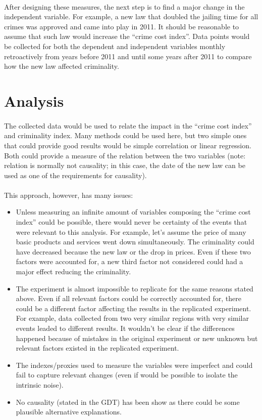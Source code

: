\documentclass[11pt, a4paper]{article}
\begin{document}
\paragraph{}After designing these measures, the next step is to find a major change in the independent variable. For example, a new law that doubled the jailing time for all crimes was approved and came into play in 2011. It should be reasonable to assume that such law would increase the “crime cost index”. Data points would be collected for both the dependent and independent variables monthly retroactively from years before 2011 and until some years after 2011 to compare how the new law affected criminality.

\section{Analysis}
\paragraph{}The collected data would be used to relate the impact in the “crime cost index” and criminality index. Many methods could be used here, but two simple ones that could provide good results would be simple correlation or linear regression. Both could provide a measure of the relation between the two variables (note: relation is normally not causality; in this case, the date of the new law can be used as one of the requirements for causality).
\paragraph{}This approach, however, has many issues:
\begin{itemize}
\item Unless measuring an infinite amount of variables composing the “crime cost index” could be possible, there would never be certainty of the events that were relevant to this analysis. For example, let’s assume the price of many basic products and services went down simultaneously. The criminality could have decreased because the new law or the drop in prices. Even if these two factors were accounted for, a new third factor not considered could had a major effect reducing the criminality.
\item The experiment is almost impossible to replicate for the same reasons stated above. Even if all relevant factors could be correctly accounted for, there could be a different factor affecting the results in the replicated experiment. For example, data collected from two very similar regions with very similar events leaded to different results. It wouldn’t be clear if the differences happened because of mistakes in the original experiment or new unknown but relevant factors existed in the replicated experiment.
\item The indexes/proxies used to measure the variables were imperfect and could fail to capture relevant changes (even if would be possible to isolate the intrinsic noise).
\item No causality (stated in the GDT) has been show as there could be some plausible alternative explanations.
\end{itemize}
\end{document}
